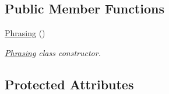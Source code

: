 \subsection*{Public Member Functions}
\begin{DoxyCompactItemize}
\item 
\hyperlink{classgameplay_1_1ai_1_1phrasing_1_1_phrasing_a369fb65d1e9363006fb8f4fa31b438de}{Phrasing} ()
\begin{DoxyCompactList}\small\item\em \hyperlink{classgameplay_1_1ai_1_1phrasing_1_1_phrasing}{Phrasing} class constructor. \end{DoxyCompactList}\end{DoxyCompactItemize}
\subsection*{Protected Attributes}
